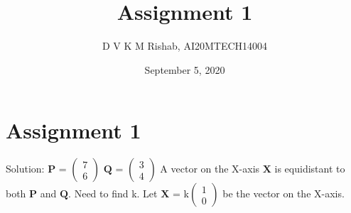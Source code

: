 \documentclass[fleqn]{article}
\title{Assignment 1}
\author{D V K M Rishab, AI20MTECH14004}
\date{September 5, 2020}
\newcommand{\myvec}[1]{\ensuremath{\begin{pmatrix}#1\end{pmatrix}}}
\begin{document}
\let\vec\mathbf
\maketitle
\section*{Assignment 1}
Solution: 
\newline \newline
$\vec{P}$ = \myvec{7\\6} \newline \newline \newline
$\vec{Q}$ = \myvec{3\\4} \newline \newline \newline
A \hspace{0.1cm} vector \hspace{0.1cm} on \hspace{0.1cm} the \hspace{0.1cm} X-axis \hspace{0.1cm} $\vec{X}$ \hspace{0.1cm} is \hspace{0.1cm} equidistant \hspace{0.1cm} to \hspace{0.1cm} both \hspace{0.1cm} $\vec{P}$ \hspace{0.1cm} and \hspace{0.1cm} $\vec{Q}$. \newline \newline
Need \hspace{0.1cm} to \hspace{0.1cm} find \hspace{0.1cm} k. \newline \newline
Let \hspace{0.1cm} $\vec{X}$ = k\myvec{1\\0} \hspace{0.1cm} be \hspace{0.1cm} the \hspace{0.1cm} vector \hspace{0.1cm} on \hspace{0.1cm} the \hspace{0.1cm} X-axis.\newline
\end{document}
